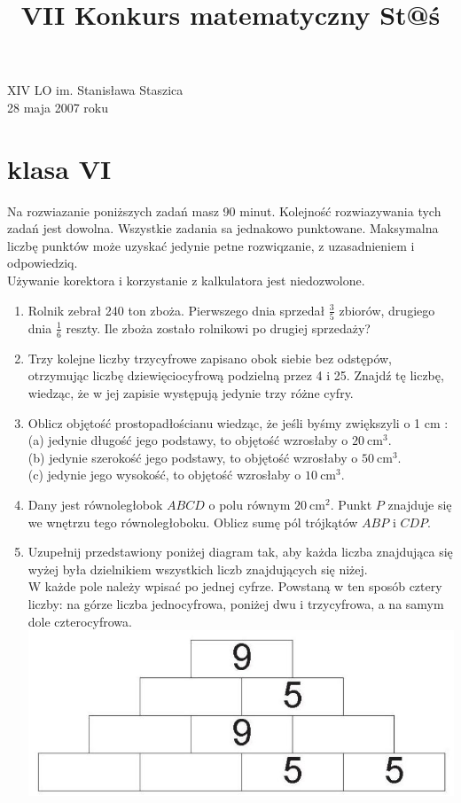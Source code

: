 \documentclass[10pt]{article}
\title{VII Konkurs matematyczny St@ś }
\author{}
\date{}
\begin{document}
\maketitle
XIV LO im. Stanisława Staszica\\
28 maja 2007 roku

\section*{klasa VI}
Na rozwiazanie poniższych zadań masz 90 minut. Kolejność rozwiazywania tych zadań jest dowolna. Wszystkie zadania sa jednakowo punktowane. Maksymalna liczbę punktów może uzyskać jedynie petne rozwiqzanie, z uzasadnieniem i odpowiedziq.\\
Używanie korektora i korzystanie z kalkulatora jest niedozwolone.

\begin{enumerate}
  \item Rolnik zebrał 240 ton zboża. Pierwszego dnia sprzedał \(\frac{3}{5}\) zbiorów, drugiego dnia \(\frac{1}{6}\) reszty. Ile zboża zostało rolnikowi po drugiej sprzedaży?
  \item Trzy kolejne liczby trzycyfrowe zapisano obok siebie bez odstępów, otrzymując liczbę dziewięciocyfrową podzielną przez 4 i 25. Znajdź tę liczbę, wiedząc, że w jej zapisie występują jedynie trzy różne cyfry.
  \item Oblicz objętość prostopadłościanu wiedząc, że jeśli byśmy zwiększyli o 1 cm :\\
(a) jedynie długość jego podstawy, to objętość wzrosłaby o \(20 \mathrm{~cm}^{3}\).\\
(b) jedynie szerokość jego podstawy, to objętość wzrosłaby o \(50 \mathrm{~cm}^{3}\).\\
(c) jedynie jego wysokość, to objętość wzrosłaby o \(10 \mathrm{~cm}^{3}\).
  \item Dany jest równoległobok \(A B C D\) o polu równym \(20 \mathrm{~cm}^{2}\). Punkt \(P\) znajduje się we wnętrzu tego równoległoboku. Oblicz sumę pól trójkątów \(A B P\) i \(C D P\).
  \item Uzupełnij przedstawiony poniżej diagram tak, aby każda liczba znajdująca się wyżej była dzielnikiem wszystkich liczb znajdujących się niżej.\\
W każde pole należy wpisać po jednej cyfrze. Powstaną w ten sposób cztery liczby: na górze liczba jednocyfrowa, poniżej dwu i trzycyfrowa, a na samym dole czterocyfrowa.\\
\includegraphics[max width=\textwidth, center]{2024_11_21_4666129bb05a0ea31c95g-1}
\end{enumerate}
\end{document}
